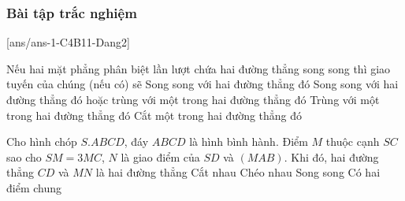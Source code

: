 \subsubsection{Bài tập trắc nghiệm}
[ans/ans-1-C4B11-Dang2]
\begin{ex}
	Nếu hai mặt phẳng phân biệt lần lượt chứa hai đường thẳng song song thì giao tuyến của chúng (nếu có) sẽ
	\choice
	{Song song với hai đường thẳng đó}
	{\True Song song với hai đường thẳng đó hoặc trùng với một trong hai đường thẳng đó}
	{Trùng với một trong hai đường thẳng đó}
	{Cắt một trong hai đường thẳng đó}
	\loigiai{
		
	}
\end{ex}

\begin{ex}%
	Cho hình chóp $S.ABCD$, đáy $ABCD$ là hình bình hành. Điểm $M$ thuộc cạnh $SC$ sao cho $SM=3MC$, $N$ là giao điểm của $SD$ và $(MAB)$. Khi đó, hai đường thẳng $CD$ và $MN$ là hai đường thẳng
	\choice
	{Cắt nhau}
	{Chéo nhau}
	{\True Song song}
	{Có hai điểm chung}
\end{ex}

